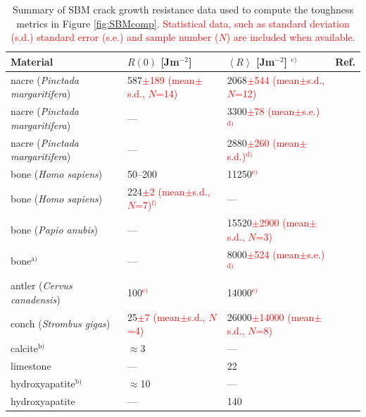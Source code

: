 \documentclass[12pt,onecolumn]{article}
\newcommand{\ra}[1]{\renewcommand{\arraystretch}{#1}}
\begin{document}
\begin{bibunit}
\begin{table}
\centering
\caption{Summary of SBM crack growth resistance data used to compute the toughness metrics in Figure \ref{fig:SBMcomp}. \textcolor{red}{Statistical data, such as standard deviation (s.d.) standard error (s.e.) and sample number ($N$) are included when available.}}
\label{tab:SBMsumm}
\ra{1.25}
\begin{threeparttable}[t]
\begin{tabular}{llll}
\toprule
Material & $R(0)$ [Jm$^{-2}$] & $\left< R\right>$ [Jm$^{-2}$] $^\text{c)}$ & Ref.\\
\midrule
nacre (\textit{Pinctada margaritifera}) & 587\textcolor{red}{$\pm$189 (mean$\pm$s.d., $N$=14)} & 2068\textcolor{red}{$\pm$544 (mean$\pm$s.d., $N$=12)} & \cite{jackson1988}\\
nacre (\textit{Pinctada margaritifera}) & --- & 3300\textcolor{red}{$\pm$78 (mean$\pm$s.e.)$^\text{d)}$} & \cite{currey1977}\\
nacre (\textit{Pinctada margaritifera}) & --- & 2880\textcolor{red}{$\pm$260 (mean$\pm$s.d.)$^\text{d)}$} & \cite{rabiei2010failure}\\
bone (\textit{Homo sapiens})& 50--200 & 11250\textcolor{red}{$^\text{e)}$} & \cite{koester2008true}\\
bone (\textit{Homo sapiens})& 224\textcolor{red}{$\pm$2 (mean$\pm$s.d., $N$=7)$^\text{f)}$} & --- & \cite{nalla2005mechanistic}\\
bone (\textit{Papio anubis})& --- & 15520\textcolor{red}{$\pm$2900 (mean$\pm$s.d., $N$=3)} & \cite{liu2000bending}\\
bone$^\text{a)}$ & --- & 8000\textcolor{red}{$\pm$524 (mean$\pm$s.e.)$^\text{d)}$} & \cite{currey1977}\\
antler (\textit{Cervus canadensis}) & 100\textcolor{red}{$^\text{e)}$} & 14000\textcolor{red}{$^\text{e)}$} & \cite{launey2009mechanistic}\\
conch (\textit{Strombus gigas}) & 25\textcolor{red}{$\pm$7 (mean$\pm$s.d., $N$=4)} & 26000\textcolor{red}{$\pm$14000 (mean$\pm$s.d., $N$=8)} & \cite{kuhn1996fracture}\\
calcite$^\text{b)}$ & $\approx$3 & --- & \cite{wegst2004mechanical}\\
limestone & --- & 22& \cite{carmichael1982crc}\\
hydroxyapatite$^\text{b)}$ & $\approx$10 & --- & \cite{wegst2004mechanical}\\
hydroxyapatite & --- & 140 & \cite{tenhuisen1995formation}\\

\end{tabular}
\end{threeparttable}
\end{table}
\end{bibunit}
\end{document}
